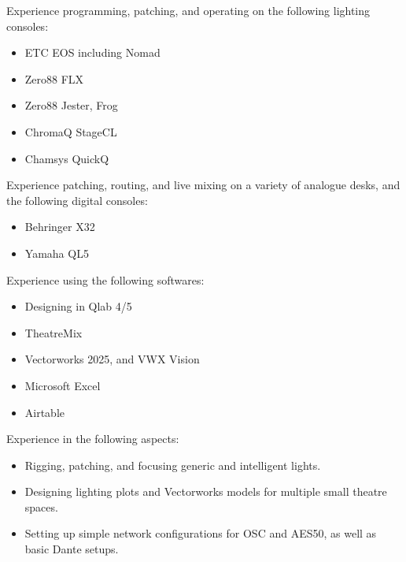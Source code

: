 \documentclass[../../cv-cs.tex]{subfiles}
\begin{document}

Experience programming, patching, and operating on the following lighting consoles:
\begin{itemize}
	\item ETC EOS including Nomad
	\item Zero88 FLX
	\item Zero88 Jester, Frog
	\item ChromaQ StageCL
	\item Chamsys QuickQ
\end{itemize}


Experience patching, routing, and live mixing on a variety of analogue desks, and the following digital consoles:
\begin{itemize}
	\item Behringer X32
	\item Yamaha QL5
\end{itemize}


Experience using the following softwares:
\begin{itemize}
	\item Designing in Qlab 4/5
	\item TheatreMix
	\item Vectorworks 2025, and VWX Vision
	\item Microsoft Excel
	\item Airtable
\end{itemize}


Experience in the following aspects:
\begin{itemize}
	\item Rigging, patching, and focusing generic and intelligent lights.
	\item Designing lighting plots and Vectorworks models for multiple small theatre spaces.
	\item Setting up simple network configurations for OSC and AES50, as well as basic Dante setups.
\end{itemize}
\end{document}
